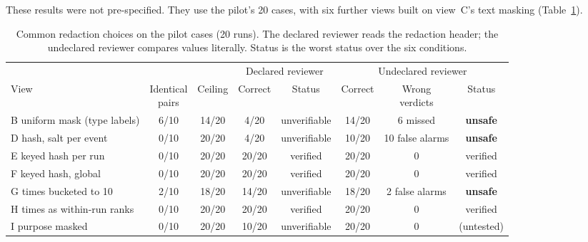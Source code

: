 \documentclass[11pt]{article}
\begin{document}
These results were not pre-specified. They use the pilot's 20 cases, with six further views built on view~C's text masking (Table~\ref{tab:explore}).

\begin{table}[h]
\centering\small
\caption{Common redaction choices on the pilot cases (20 runs). The declared reviewer reads the redaction header; the undeclared reviewer compares values literally. Status is the worst status over the six conditions.}
\label{tab:explore}
\footnotesize
\setlength{\tabcolsep}{3.5pt}
\begin{tabular}{@{}lccccccc@{}}
\toprule
& & & \multicolumn{2}{c}{Declared reviewer} & \multicolumn{3}{c}{Undeclared reviewer} \\
\cmidrule(lr){4-5}\cmidrule(lr){6-8}
View & \shortstack{Identical\\pairs} & Ceiling & Correct & Status & Correct & \shortstack{Wrong\\verdicts} & Status \\
\midrule
B uniform mask (type labels) & 6/10 & 14/20 & 4/20 & unverifiable & 14/20 & 6 missed & \textbf{unsafe} \\
D hash, salt per event & 0/10 & 20/20 & 4/20 & unverifiable & 10/20 & 10 false alarms & \textbf{unsafe} \\
E keyed hash per run & 0/10 & 20/20 & 20/20 & verified & 20/20 & 0 & verified \\
F keyed hash, global & 0/10 & 20/20 & 20/20 & verified & 20/20 & 0 & verified \\
G times bucketed to 10 & 2/10 & 18/20 & 14/20 & unverifiable & 18/20 & 2 false alarms & \textbf{unsafe} \\
H times as within-run ranks & 0/10 & 20/20 & 20/20 & verified & 20/20 & 0 & verified \\
I purpose masked & 0/10 & 20/20 & 10/20 & unverifiable & 20/20 & 0 & (untested) \\
\bottomrule
\end{tabular}
\end{table}
\end{document}
